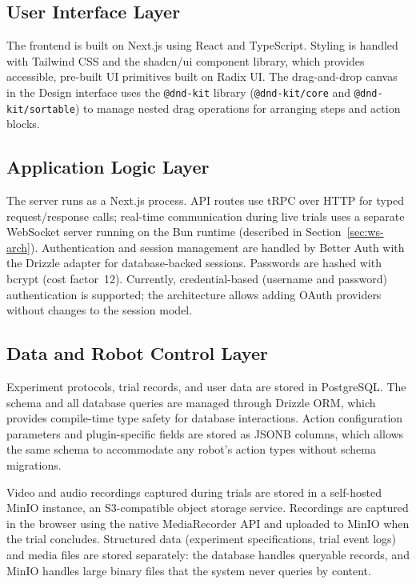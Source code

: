 \subsection{User Interface Layer}

The frontend is built on Next.js using React and TypeScript. Styling is handled with Tailwind CSS and the shadcn/ui component library, which provides accessible, pre-built UI primitives built on Radix UI. The drag-and-drop canvas in the Design interface uses the \texttt{@dnd-kit} library (\texttt{@dnd-kit/core} and \texttt{@dnd-kit/sortable}) to manage nested drag operations for arranging steps and action blocks.

\subsection{Application Logic Layer}

The server runs as a Next.js process. API routes use tRPC over HTTP for typed request/response calls; real-time communication during live trials uses a separate WebSocket server running on the Bun runtime (described in Section~\ref{sec:ws-arch}). Authentication and session management are handled by Better Auth with the Drizzle adapter for database-backed sessions. Passwords are hashed with bcrypt (cost factor~12). Currently, credential-based (username and password) authentication is supported; the architecture allows adding OAuth providers without changes to the session model.

\subsection{Data and Robot Control Layer}

Experiment protocols, trial records, and user data are stored in PostgreSQL. The schema and all database queries are managed through Drizzle ORM, which provides compile-time type safety for database interactions. Action configuration parameters and plugin-specific fields are stored as JSONB columns, which allows the same schema to accommodate any robot's action types without schema migrations.

Video and audio recordings captured during trials are stored in a self-hosted MinIO instance, an S3-compatible object storage service. Recordings are captured in the browser using the native MediaRecorder API and uploaded to MinIO when the trial concludes. Structured data (experiment specifications, trial event logs) and media files are stored separately: the database handles queryable records, and MinIO handles large binary files that the system never queries by content.

